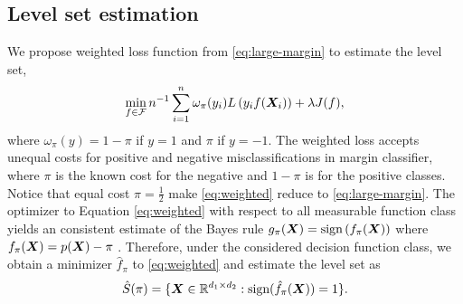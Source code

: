 \documentclass[12pt]{article}
\begin{document}
\subsection{Level set estimation}
\label{subsec:pb2}
We propose weighted loss function from \eqref{eq:large-margin} to estimate the level set, 
\begin{align}
\label{eq:weighted}
\min_{f\in\mathcal{F}}n^{-1}\sum_{i=1}^n \omega_{\pi}(y_i)L\left(y_if(\bm X_i)\right)+ \lambda J(f),
\end{align}
where $\omega_\pi(y) = 1-\pi $ if $y = 1$ and $\pi$ if $y = -1$. The weighted loss accepts unequal costs for positive and negative misclassifications in margin classifier, where $\pi$ is the known cost for the negative and $1-\pi$ is for the positive classes. Notice that equal cost $\pi = \frac{1}{2}$ make \eqref{eq:weighted} reduce to \eqref{eq:large-margin}. 
The optimizer to Equation \eqref{eq:weighted} with respect to all measurable function class yields an consistent estimate of the Bayes rule $g_\pi(\bm X) = \text{sign}\left(f_\pi(\bm X)\right)$ where $f_\pi(\bm X) = p(\bm X) - \pi$ \citep{lin2002support,wang2008probability}. 
Therefore, under the considered decision function class, we obtain a minimizer $\hat f_\pi$ to \eqref{eq:weighted} and estimate the level set as
\begin{align}\label{eq:levelset}\hat S(\pi) = \{\bm X\in\mathbb{R}^{d_1\times d_2} : \text{sign}(\hat f_\pi(\bm X)) = 1\}
.\end{align}
\end{document}
